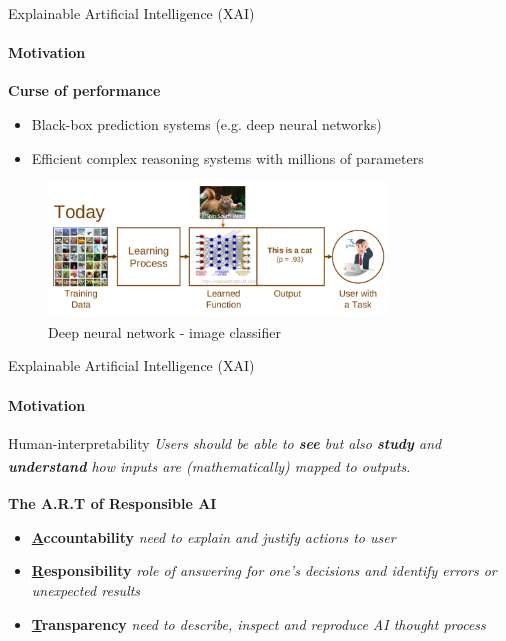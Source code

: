 \documentclass{beamer}
\begin{document}
\begin{frame}{\small{Explainable Artificial Intelligence (XAI)}}
    \framesubtitle{Motivation}
    \textbf{Curse of performance}
    \begin{itemize}
        \item Black-box prediction systems (e.g. deep neural networks)
        \item Efficient complex reasoning systems with millions of parameters
    \end{itemize}

    \begin{figure}[]
        \centering
        \includegraphics[width=0.8\textwidth]{figures/cat}
        {\small \caption{Deep neural network - image classifier \textsuperscript{\cite{gunning2017explainable}}}}
        \label{catdog}
    \end{figure}

\end{frame}

\begin{frame}{\small{Explainable Artificial Intelligence (XAI)}}
    \framesubtitle{Motivation}
    \begin{block}{Human-interpretability}
        \emph{Users should be able to \textbf{see} but also \textbf{study} and \textbf{understand} how inputs are (mathematically) mapped to outputs.} \textsuperscript{\cite{doran2017does}}
    \end{block}
    \vfill
    \textbf{The A.R.T of Responsible AI \textsuperscript{\cite{adadi2018peeking}}}
    \begin{itemize}
        \item \textbf{\underline{A}ccountability} \textit{need to explain and justify actions to user}
        \item \textbf{\underline{R}esponsibility} \textit{role of answering for one's decisions and identify errors or unexpected results}
        \item \textbf{\underline{T}ransparency} \textit{need to describe, inspect and reproduce AI thought process}
    \end{itemize}
\end{frame}
\end{document}
